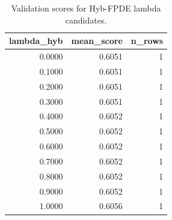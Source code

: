 \begin{table}[t]
\caption{Validation scores for Hyb-FPDE lambda candidates.}
\label{tab:lambda_distribution_computed}
\centering
\begin{tabular}{rrr}
\toprule
lambda\_hyb & mean\_score & n\_rows \\
\midrule
0.0000 & 0.6051 & 1 \\
0.1000 & 0.6051 & 1 \\
0.2000 & 0.6051 & 1 \\
0.3000 & 0.6051 & 1 \\
0.4000 & 0.6052 & 1 \\
0.5000 & 0.6052 & 1 \\
0.6000 & 0.6052 & 1 \\
0.7000 & 0.6052 & 1 \\
0.8000 & 0.6052 & 1 \\
0.9000 & 0.6052 & 1 \\
1.0000 & 0.6056 & 1 \\
\bottomrule
\end{tabular}

\end{table}

